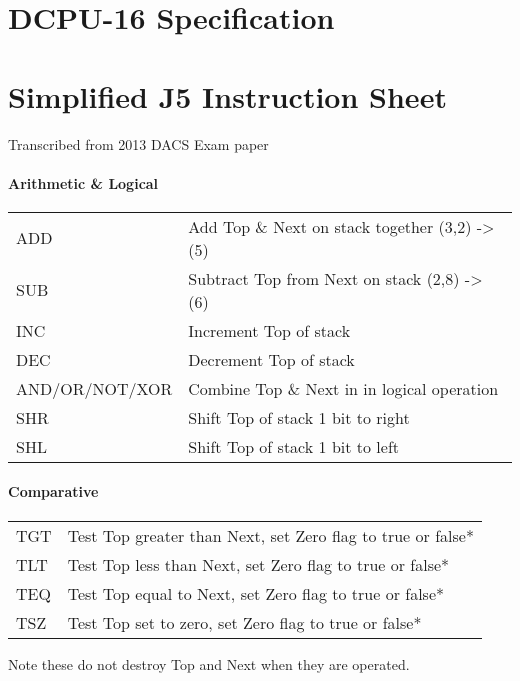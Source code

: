 \chapter{DCPU-16 Specification}
\chapter{Simplified J5 Instruction Sheet}
Transcribed from 2013 DACS Exam paper
\subsubsection{Arithmetic \& Logical}
\begingroup
\ttfamily
\begin{tabularx}{0.95\textwidth}{l X}
  ADD & Add Top \& Next on stack together   (3,2) -> (5) \\
  SUB & Subtract Top from Next on stack   (2,8) -> (6) \\
  INC & Increment Top of stack \\
  DEC & Decrement Top of stack \\
  AND/OR/NOT/XOR & Combine Top \& Next in in logical operation \\
  SHR & Shift Top of stack 1 bit to right \\
  SHL & Shift Top of stack 1 bit to left \\
\end{tabularx}
\endgroup

\subsubsection{Comparative}
\begingroup
\ttfamily
\begin{tabularx}{0.95\textwidth}{l X}
  TGT & Test Top greater than Next, set Zero flag to true or false* \\
  TLT & Test Top less than Next, set Zero flag to true or false* \\
  TEQ & Test Top equal to Next, set Zero flag to true or false* \\
  TSZ & Test Top set to zero, set Zero flag to true or false* \\
\end{tabularx}
\endgroup

\hfill*Note these do not destroy Top and Next when they are operated.


